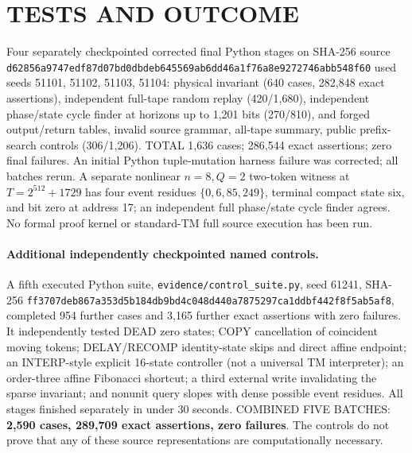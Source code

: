 \documentclass[11pt]{article}
\begin{document}
\section{TESTS AND OUTCOME}
Four separately checkpointed corrected final Python stages on SHA-256 source \texttt{d62856a9747edf87d07bd0dbdeb645569ab6dd46a1f76a8e9272746abb548f60} used seeds 51101, 51102, 51103, 51104: physical invariant (640 cases, 282,848 exact assertions), independent full-tape random replay (420/1,680), independent phase/state cycle finder at horizons up to 1,201 bits (270/810), and forged output/return tables, invalid source grammar, all-tape summary, public prefix-search controls (306/1,206). TOTAL 1,636 cases; 286,544 exact assertions; zero final failures. An initial Python tuple-mutation harness failure was corrected; all batches rerun. A separate nonlinear $n=8,Q=2$ two-token witness at $T=2^{512}+1729$ has four event residues $\{0,6,85,249\}$, terminal compact state six, and bit zero at address 17; an independent full phase/state cycle finder agrees. No formal proof kernel or standard-TM full source execution has been run.
\paragraph{Additional independently checkpointed named controls.}
A fifth executed Python suite, \texttt{evidence/control\_suite.py}, seed 61241, SHA-256 \texttt{ff3707deb867a353d5b184db9bd4c048d440a7875297ca1ddbf442f8f5ab5af8}, completed 954 further cases and 3,165 further exact assertions with zero failures. It independently tested DEAD zero states; COPY cancellation of coincident moving tokens; DELAY/RECOMP identity-state skips and direct affine endpoint; an INTERP-style explicit 16-state controller (not a universal TM interpreter); an order-three affine Fibonacci shortcut; a third external write invalidating the sparse invariant; and nonunit query slopes with dense possible event residues. All stages finished separately in under 30 seconds. COMBINED FIVE BATCHES: \textbf{2,590 cases, 289,709 exact assertions, zero failures}. The controls do not prove that any of these source representations are computationally necessary.
\end{document}

